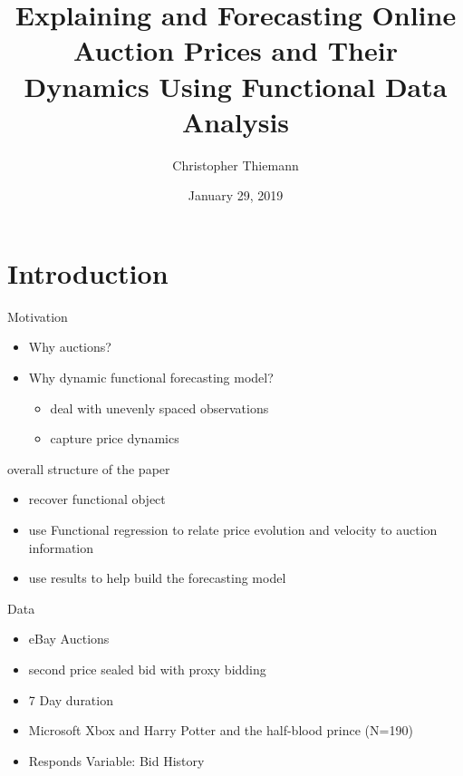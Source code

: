 \documentclass[hyperref={pdfpagelabels=false}]{beamer}
\title{Explaining and Forecasting Online Auction
Prices and Their Dynamics Using
Functional Data Analysis}
\author{Christopher Thiemann}
\date{January 29, 2019}
\let\otp\titlepage
\renewcommand{\titlepage}{\otp\addtocounter{framenumber}{-1}}
\begin{document}
\begin{frame}[plain]
\titlepage
\end{frame}


\section{Introduction}

\begin{frame}{Motivation}
    \begin{itemize}
        \item Why auctions?
        \item Why dynamic functional forecasting model?
        \begin{itemize}
            \item deal with unevenly spaced observations
            \item capture price dynamics
        \end{itemize}    
    \end{itemize}
    overall structure of the paper
    \begin{itemize}
        \item recover functional object
        \item use Functional regression to relate price evolution and velocity to auction information
        \item use results to help build the forecasting model
    \end{itemize}
\end{frame}


\begin{frame}{Data}
\begin{itemize}
    \item eBay Auctions
    \item second price sealed bid with proxy bidding
    \item 7 Day duration
    \item Microsoft Xbox and Harry Potter and the half-blood prince (N=190)
    \item Responds Variable: Bid History
\end{itemize}
\end{frame}
\end{document}
